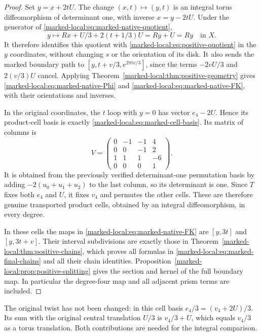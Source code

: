 \begin{proof}
Set $y=x+2tU$. The change $(x,t)\mapsto(y,t)$ is an integral
torus diffeomorphism of determinant one, with inverse
$x=y-2tU$. Under the generator of \eqref{marked-local:eq:marked-native-quotient},
\[
 y\longmapsto Rx+U/3+2(t+1/3)U=Ry+U=Ry
                         \quad\text{in }X.
\]
It therefore identifies this quotient with
\eqref{marked-local:eq:positive-quotient} in the $y$ coordinates, without
changing $s$ or the orientation of its disk. It also sends the
marked boundary path to
$[y,t+v/3,e^{2\pi iv/3}]$, since the terms $-2vU/3$ and
$2(v/3)U$ cancel. Applying Theorem~\ref{marked-local:thm:positive-geometry}
gives \eqref{marked-local:eq:marked-native-Phi} and
\eqref{marked-local:eq:marked-native-FK}, with their orientations and inverses.

In the original coordinates, the $t$ loop with $y=0$ has vector
$e_4-2U$. Hence its product-cell basis is exactly
\eqref{marked-local:eq:marked-cell-basis}. Its matrix of columns is
\begin{equation}\label{marked-local:eq:marked-basis-matrix}
 V=\begin{pmatrix}
 0&-1&-1&4\\0&0&-1&2\\1&1&1&-6\\0&0&0&1
 \end{pmatrix}.
\end{equation}
It is obtained from the previously verified determinant-one
permutation basis by adding $-2(u_0+u_1+u_2)$ to the last
column, so its determinant is one. Since $T$ fixes both
$e_4$ and $U$, it fixes $v_4$ and permutes the other cells.
These are therefore genuine transported product cells, obtained
by an integral diffeomorphism, in every degree.

In these cells the maps in \eqref{marked-local:eq:marked-native-FK} are
$[y,3t]$ and $[y,3t+v]$. Their interval subdivisions are exactly
those in Theorem~\ref{marked-local:thm:positive-chains}, which proves all
formulas in \eqref{marked-local:eq:marked-final-chains} and all their chain
identities. Proposition~\ref{marked-local:prop:positive-splitting} gives the
section and kernel of the full boundary map. In particular the
degree-four map and all adjacent prism terms are included.
\end{proof}

The original twist has not been changed: in this cell basis
$e_4/3=(v_4+2U)/3$. Its sum with the original central translation
$U/3$ is $v_4/3+U$, which equals $v_4/3$ as a torus translation.
Both contributions are needed for the integral comparison.

